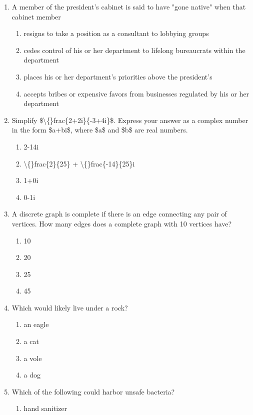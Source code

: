 \documentclass[12pt]{article}
\begin{document}
\begin{enumerate}[label=\arabic*.]
\begin{enumerate}[label=(\alph*)]
\end{enumerate}
\item A member of the president's cabinet is said to have "gone native" when that cabinet member
\begin{enumerate}[label=(\alph*)]
    \item resigns to take a position as a consultant to lobbying groups
    \item cedes control of his or her department to lifelong bureaucrats within the department
    \item places his or her department's priorities above the president's
    \item accepts bribes or expensive favors from businesses regulated by his or her department
\end{enumerate}
\item Simplify \$\textbackslash\{\}frac\{2+2i\}\{-3+4i\}\$. Express your answer as a complex number in the form \$a+bi\$, where \$a\$ and \$b\$ are real numbers.
\begin{enumerate}[label=(\alph*)]
    \item 2-14i
    \item \textbackslash\{\}frac\{2\}\{25\} + \textbackslash\{\}frac\{-14\}\{25\}i
    \item 1+0i
    \item 0-1i
\end{enumerate}
\item A discrete graph is complete if there is an edge connecting any pair of vertices. How many edges does a complete graph with 10 vertices have?
\begin{enumerate}[label=(\alph*)]
    \item 10
    \item 20
    \item 25
    \item 45
\end{enumerate}
\item Which would likely live under a rock?
\begin{enumerate}[label=(\alph*)]
    \item an eagle
    \item a cat
    \item a vole
    \item a dog
\end{enumerate}
\item Which of the following could harbor unsafe bacteria?
\begin{enumerate}[label=(\alph*)]
    \item hand sanitizer

\end{enumerate}
\end{enumerate}
\end{document}
